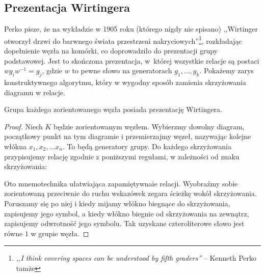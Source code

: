 
\subsection{Prezentacja Wirtingera}
%
Perko \cite{perko2016} pisze, że na wykładzie w 1905 roku (którego nigdy nie spisano) ,,Wirtinger otworzył drzwi do barwnego świata przestrzeni nakryciowych''\footnote{\emph{,,I think covering spaces can be understood by fifth graders''} -- Kenneth Perko tamże}, rozkładając dopełnienie węzła na komórki, co doprowadziło do prezentacji grupy podstawowej.
%
%
Jest to skończona prezentacja, w~której wszystkie relacje są postaci $w g_i w^{-1} = g_j$, gdzie $w$ to pewne słowo na generatorach $g_1, \ldots, g_k$.
Pokażemy zarys konstruktywnego algorytmu, który w wygodny sposób zamienia skrzyżowania diagramu w relacje.

\begin{proposition}
    Grupa każdego zorientowanego węzła posiada prezentację Wirtingera.
\end{proposition}

\begin{proof}
    Niech $K$ będzie zorientowanym węzłem.
    Wybierzmy dowolny diagram, początkowy punkt na tym diagramie i przemierzajmy węzeł, nazywając kolejne włókna $x_1, x_2, \ldots x_{n}$.
    To będą generatory grupy.
    Do każdego skrzyżowania przypisujemy relację zgodnie z poniższymi regułami, w zależności od znaku skrzyżowania:

\noindent
    Oto mnemotechnika ułatwiająca zapamiętywnaie relacji.
    Wyobraźmy sobie zorientowaną przeciwnie do ruchu wskazówek zegara ścieżkę wokół skrzyżowania.
    Poruszamy się po niej i kiedy mijamy włókno biegnące do skrzyżowania, zapisujemy jego symbol, a kiedy włókno biegnie od skrzyżowania na zewnątrz, zapisujemy odwrotność jego symbolu.
    Tak uzyskane czteroliterowe słowo jest równe $1$ w grupie węzła.
\end{proof}

